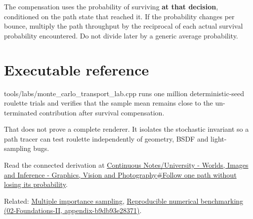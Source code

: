 The compensation uses the probability of surviving \textbf{at that decision}, conditioned on the path state that reached it. If the probability changes per bounce, multiply the path throughput by the reciprocal of each actual survival probability encountered. Do not divide later by a generic average probability.

\section{Executable reference}\label{appendix-7277c62d4599-executable-reference}

tools/labs/monte\_carlo\_transport\_lab.cpp runs one million deterministic-seed roulette trials and verifies that the sample mean remains close to the un-terminated contribution after survival compensation.

That does not prove a complete renderer. It isolates the stochastic invariant so a path tracer can test roulette independently of geometry, BSDF and light-sampling bugs.

Read the connected derivation at \href{Continuous\%20Notes/University\%20-\%20Worlds,\%20Images\%20and\%20Inference\%20-\%20Graphics,\%20Vision\%20and\%20Photography\#Follow\%20one\%20path\%20without\%20losing\%20its\%20probability}{Continuous Notes/University - Worlds, Images and Inference - Graphics, Vision and Photography\#Follow one path without losing its probability}.

Related: \hyperref[appendix-ca8898faf1a6]{Multiple importance sampling}, \href{../02-Foundations-II/main.pdf\#nameddest=appendix-b9db93e28371}{Reproducible numerical benchmarking (02-Foundations-II, appendix-b9db93e28371)}.
